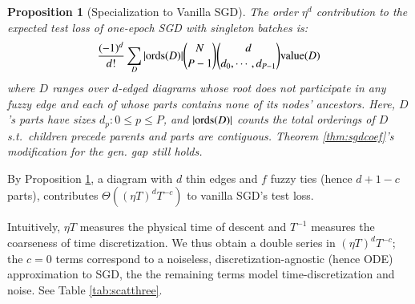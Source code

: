 \documentclass{article}
\theoremstyle{plain}
\newtheorem{prop}{Proposition}
\theoremstyle{definition}
\newtheorem{exm}{Example}
\newcommand{\wrap}[1]{\left(#1\right)}
\newcommand{\dvalue}{\text{\textnormal{value}}}
\newcommand{\ords}{\text{\textnormal{ords}}}
\begin{document}
        \begin{prop}[Specialization to Vanilla SGD] \label{prop:vanilla}
            The order $\eta^d$ contribution to the expected test loss of
            one-epoch SGD with singleton batches is:
            \begin{equation*}\label{eq:sgdbasiccoef}
                \frac{(-1)^d}{d!} \sum_{D} 
                |\ords(D)| {N \choose P-1} {d \choose d_0,\cdots,d_{P-1}}
                \dvalue(D)
            \end{equation*}
            where $D$ ranges over $d$-edged diagrams whose root
            does not participate in any fuzzy edge and each of whose parts contains
            none of its nodes' ancestors.  Here, $D$'s parts have sizes
            $d_p: 0\leq p\leq P$, and $|\ords(D)|$ counts the total
            orderings of $D$ s.t.\ children precede parents and parts are
            contiguous.
            Theorem \ref{thm:sgdcoef}'s modification for the gen. gap still
            holds.
        \end{prop}

        By Proposition \ref{prop:vanilla}, a diagram with $d$ thin edges and
        $f$ fuzzy ties (hence $d+1-c$ parts), contributes $\Theta\wrap{(\eta
        T)^d T^{-c}}$ to vanilla SGD's test loss.  
        
        Intuitively, $\eta T$ measures the physical time of descent and
        $T^{-1}$ measures the coarseness of time discretization.  We thus
        obtain a double series in $(\eta T)^d T^{-c}$; the $c=0$ terms
        correspond to a noiseless, discretization-agnostic (hence ODE)
        approximation to SGD, the the remaining terms model time-discretization
        and noise.  See Table \ref{tab:scatthree}. 

\end{document}

